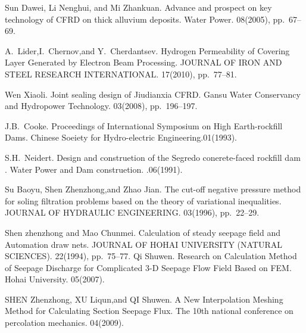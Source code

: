 
\begin{thebibliography}{10}
 
{\sc Sun Dawei, Li Nenghui, and Mi Zhankuan}. {Advance and prospect on key technology of CFRD on thick alluvium deposits}. Water Power. 08(2005), pp.~67--69.

{\sc A.~Lider,I.~Chernov,and Y.~Cherdantsev}. {Hydrogen Permeability of Covering Layer Generated by Electron Beam Processing}. JOURNAL OF IRON AND STEEL RESEARCH INTERNATIONAL. 17(2010), pp.~77--81.

{\sc Wen Xiaoli}. {Joint sealing design of Jiudianxia CFRD}. Gansu Water Conservancy and Hydropower Technology. 03(2008), pp.~196--197.

{\sc J.B.~Cooke}. {Proceedings of International Symposium on High Earth-rockfill Dams}. Chinese Soeiety for Hydro-electric Engineering.01(1993).

{\sc S.H.~Neidert}. {Design and construetion of the Segredo conerete-faced rockfill dam }. Water Power and Dam construetion. .06(1991).

{\sc Su Baoyu, Shen Zhenzhong,and Zhao Jian}. {The cut-off negative pressure method for soling filtration problems based on the theory of variational inequalities}. JOURNAL OF HYDRAULIC ENGINEERING. 03(1996), pp.~22--29.

{\sc Shen zhenzhong and Mao Chunmei}. {Calculation of steady seepage field and Automation draw nets}. JOURNAL OF HOHAI UNIVERSITY (NATURAL SCIENCES). 22(1994), pp.~75--77.
{\sc Qi Shuwen}. {Research on Calculation Method of Seepage Discharge for Complicated 3-D Seepage Flow Field Based on FEM}. Hohai University. 05(2007).

{\sc SHEN Zhenzhong, XU Liqun,and QI Shuwen}. {A New Interpolation Meshing Method for Calculating Section Seepage Flux}. The 10th national conference on percolation mechanics. 04(2009).

\end{thebibliography}
